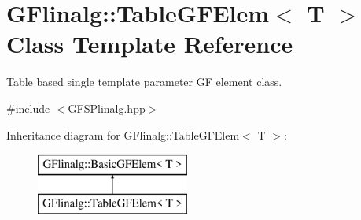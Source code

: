 \hypertarget{class_g_flinalg_1_1_table_g_f_elem}{}\section{G\+Flinalg\+::Table\+G\+F\+Elem$<$ T $>$ Class Template Reference}
\label{class_g_flinalg_1_1_table_g_f_elem}


Table based single template parameter GF element class.  




{\ttfamily \#include $<$G\+F\+S\+Plinalg.\+hpp$>$}

Inheritance diagram for G\+Flinalg\+::Table\+G\+F\+Elem$<$ T $>$\+:\begin{figure}[H]
\begin{center}
\leavevmode
\includegraphics[height=2.000000cm]{class_g_flinalg_1_1_table_g_f_elem}
\end{center}
\end{figure}
